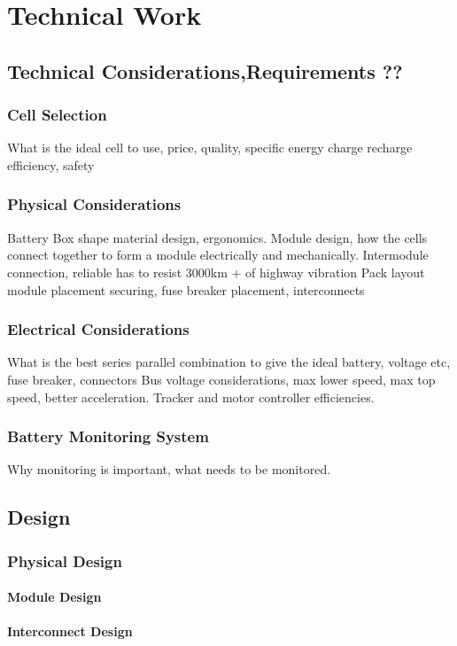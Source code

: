 \chapter{Technical Work}

\section{Technical Considerations,Requirements ??}
\subsection{Cell Selection}
What is the ideal cell to use, price, quality, specific energy charge recharge efficiency, safety
\subsection{Physical Considerations}
Battery Box shape material design, ergonomics.
Module design, how the cells connect together to form a module electrically and mechanically.
Intermodule connection, reliable has to resist 3000km + of highway vibration
Pack layout module placement securing, fuse breaker placement, interconnects
\subsection{Electrical Considerations}
What is the best series parallel combination to give the ideal battery, voltage etc, fuse breaker, connectors
Bus voltage considerations, max lower speed, max top speed, better acceleration. Tracker and motor controller efficiencies.
\subsection{Battery Monitoring System}
Why monitoring is important, what needs to be monitored. 


\section{Design}
\subsection{Physical Design}
\subsubsection{Module Design}
\subsubsection{Interconnect Design}
